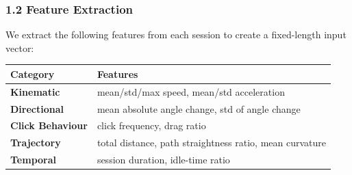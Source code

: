 \documentclass[11pt]{article}
\begin{document}
    \subsubsection{1.2 Feature Extraction}\label{feature-extraction}

We extract the following features from each session to create a
fixed-length input vector:

{\def\LTcaptype{none} %
\begin{longtable}[]{@{}
  >{\raggedright\arraybackslash}p{}
  >{\raggedright\arraybackslash}p{}@{}}
\toprule\noalign{}
\begin{minipage}[b]{\linewidth}\raggedright
Category
\end{minipage} & \begin{minipage}[b]{\linewidth}\raggedright
Features
\end{minipage} \\
\midrule\noalign{}
\endhead
\bottomrule\noalign{}
\endlastfoot
\textbf{Kinematic} & mean/std/max speed, mean/std acceleration \\
\textbf{Directional} & mean absolute angle change, std of angle
change \\
\textbf{Click Behaviour} & click frequency, drag ratio \\
\textbf{Trajectory} & total distance, path straightness ratio, mean
curvature \\
\textbf{Temporal} & session duration, idle-time ratio \\
\end{longtable}
}
\end{document}
